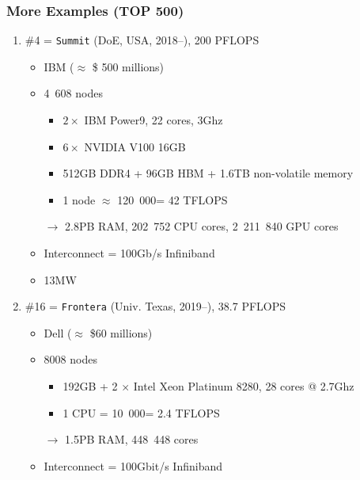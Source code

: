\documentclass[xcolor={x11names,svgnames,psnames}]{beamer}
\newcommand{\euro}{\EUR\xspace}
\begin{document}

\begin{frame}
  \frametitle{More Examples (TOP 500)}

  \begin{enumerate}
  \item \#4 = \texttt{Summit} (DoE, USA, 2018--), 200 PFLOPS
    \begin{itemize}
    \item IBM  ($\approx$ \$ 500 millions)
    \item 4~608 nodes
      \begin{itemize}
      \item $2 \times$ IBM Power9, 22 cores, 3Ghz
      \item $6 \times$ NVIDIA V100 16GB
      \item 512GB DDR4 + 96GB HBM + 1.6TB non-volatile memory
      \item 1 node $\approx$ 120~000\euro = 42 TFLOPS
      \end{itemize}
    \item[$\rightarrow$] 2.8PB RAM, 202~752 CPU cores, 2~211~840 GPU cores 
    \item Interconnect = 100Gb/s Infiniband 
    \item 13MW 
    \end{itemize}

    \medskip\pause

  \item \#16 = \texttt{Frontera} (Univ. Texas, 2019--), 38.7 PFLOPS
    \begin{itemize}
    \item Dell ($\approx$ \$60 millions)
    \item 8008 nodes
      \begin{itemize}
        \item 192GB + 2 $\times$ Intel Xeon Platinum 8280, 28 cores @ 2.7Ghz
        \item 1 CPU = 10~000\euro = 2.4 TFLOPS
        \end{itemize}
      \item[$\rightarrow$] 1.5PB RAM, 448~448 cores
    \item Interconnect = 100Gbit/s Infiniband 
    \end{itemize}
  \end{enumerate}
\end{frame}

\end{document}
